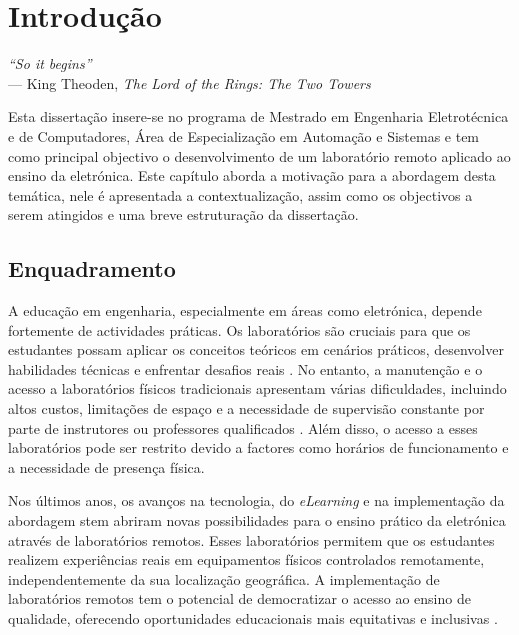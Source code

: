 
\chapter{Introdução} 	%
\label{Capítulo1} 		%

\begin{flushright}
\textit{``So it begins''} \\[0.5em]
--- King Theoden, \textit{The Lord of the Rings: The Two Towers}
\end{flushright}
Esta dissertação insere-se no programa de Mestrado em Engenharia Eletrotécnica e de Computadores, Área de Especialização em Automação e Sistemas e tem como principal objectivo o desenvolvimento de um \acrfull{laboratório remoto} aplicado ao ensino da eletrónica.
Este capítulo aborda a motivação para a abordagem desta temática, nele é apresentada a contextualização, assim como os objectivos a serem atingidos e uma breve estruturação da dissertação.

\section{Enquadramento}
\label{sec: Enquadramento}
A educação em engenharia, especialmente em áreas como eletrónica, depende fortemente de actividades práticas. Os laboratórios são cruciais para que os estudantes possam aplicar os conceitos teóricos em cenários práticos, desenvolver habilidades técnicas e enfrentar desafios reais \cite{Hofstein, BRINSON2015218}. No entanto, a manutenção e o acesso a laboratórios físicos tradicionais apresentam várias dificuldades, incluindo altos custos, limitações de espaço e a necessidade de supervisão constante por parte de instrutores ou professores qualificados \cite{feisel}. Além disso, o acesso a esses laboratórios pode ser restrito devido a factores como horários de funcionamento e a necessidade de presença física.

Nos últimos anos, os avanços na tecnologia, do \textit{eLearning} e na implementação da abordagem \acrfull{stem} abriram novas possibilidades para o ensino prático da eletrónica através de laboratórios remotos. Esses laboratórios permitem que os estudantes realizem experiências reais em equipamentos físicos controlados remotamente, independentemente da sua localização geográfica. A implementação de laboratórios remotos tem o potencial de democratizar o acesso ao ensino de qualidade, oferecendo oportunidades educacionais mais equitativas e inclusivas \cite{CORTER20112054}.


